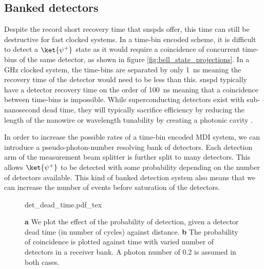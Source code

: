 
\subsection{Banked detectors}

Despite the record short recovery time that \acp{snspd} offer, this time can still be destructive for fast clocked systems. In a time-bin encoded scheme, it is difficult to detect a $\ket{\psi^+}$ state as it would require a coincidence of concurrent time-bins of the same detector, as shown in figure \ref{fig:bell_state_projections}. In a GHz clocked system, the time-bins are separated by only \SI{1}{\ns} meaning the recovery time of the detector would need to be less than this. \Ac{snspd} typically have a detector recovery time on the order of \SI{100}{\ns} meaning that a coincidence between time-bins is impossible. While superconducting detectors exist with sub-nanosecond dead time, they will typically sacrifice efficiency by reducing the length of the nanowire or wavelength tunability by creating a photonic cavity \cite{vetter2016, yun2019}.

In order to increase the possible rates of a time-bin encoded \ac{MDI} system, we can introduce a pseudo-photon-number resolving bank of detectors. Each detection arm of the measurement beam splitter is further split to many detectors. This allows $\ket{\psi^+}$ to be detected with some probability depending on the number of detectors available. This kind of banked detection system also means that we can increase the number of events before saturation of the detectors. 

\begin{figure}[tbp]
	\centering
	\tiny
	\def\svgwidth{\textwidth} 
	{det_dead_time.pdf_tex}
	\caption[Effect of detector dead time and banked detectors]{\textbf{a} We plot the effect of the probability of detection, given a detector dead time (in number of cycles) against distance. \textbf{b} The probability of coincidence is plotted against time with varied number of detectors in a receiver bank. A photon number of 0.2 is assumed in both cases. }
	\label{fig:det_eff_dead_time}
\end{figure}

